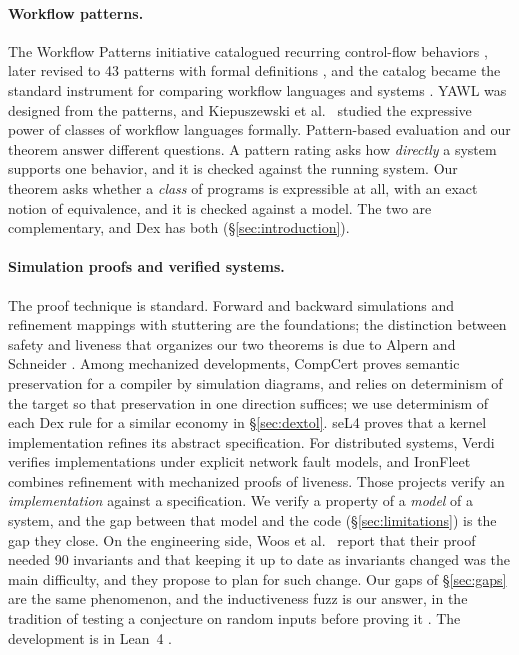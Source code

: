 \paragraph{Workflow patterns.}
The Workflow Patterns initiative catalogued recurring control-flow
behaviors \cite{vanderaalst2003patterns}, later revised to 43 patterns with
formal definitions \cite{russell2006revised}, and the catalog became the
standard instrument for comparing workflow languages and systems
\cite{wohed2009patterns}. YAWL \cite{vanderaalst2005yawl} was designed from
the patterns, and Kiepuszewski et al.\ \cite{kiepuszewski2003fundamentals}
studied the expressive power of classes of workflow languages formally.
Pattern-based evaluation and our theorem answer different questions. A
pattern rating asks how \emph{directly} a system supports one behavior, and
it is checked against the running system. Our theorem asks whether a
\emph{class} of programs is expressible at all, with an exact notion of
equivalence, and it is checked against a model. The two are complementary,
and Dex has both (\S\ref{sec:introduction}).

\paragraph{Simulation proofs and verified systems.}
The proof technique is standard. Forward and backward simulations
\cite{lynch1995simulations} and refinement mappings with stuttering
\cite{abadi1991refinement} are the foundations; the distinction between
safety and liveness that organizes our two theorems is due to Alpern and
Schneider \cite{alpern1985liveness}. Among mechanized developments,
CompCert \cite{leroy2009compcert} proves semantic preservation for a
compiler by simulation diagrams, and relies on determinism of the target
so that preservation in one direction suffices; we use determinism of each
Dex rule for a similar economy in \S\ref{sec:dextol}. seL4
\cite{klein2009sel4} proves that a kernel implementation refines its
abstract specification. For distributed systems, Verdi
\cite{wilcox2015verdi} verifies implementations under explicit network
fault models, and IronFleet \cite{hawblitzel2015ironfleet} combines
refinement with mechanized proofs of liveness. Those
projects verify an \emph{implementation} against a specification. We verify
a property of a \emph{model} of a system, and the gap between that model
and the code (\S\ref{sec:limitations}) is the gap they close. On the
engineering side, Woos et al.\ \cite{woos2016planning} report that their
proof needed 90 invariants and that keeping it up to date as invariants
changed was the main difficulty, and they propose to plan for such change.
Our gaps of \S\ref{sec:gaps} are the same phenomenon, and the
inductiveness fuzz is our answer, in the tradition of
testing a conjecture on random inputs before proving it
\cite{claessen2000quickcheck}. The development is in Lean~4
\cite{demoura2021lean4}.

